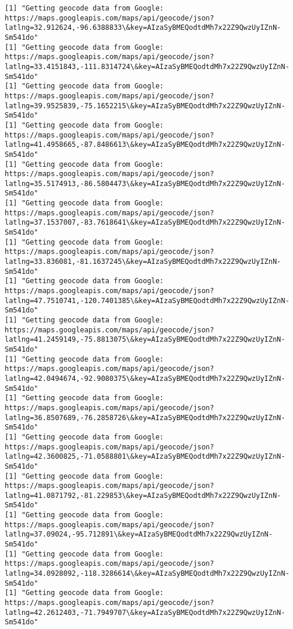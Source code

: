 \documentclass[11pt]{article}
\begin{document}
\begin{Verbatim}[commandchars=\\\{\}]
[1] "Getting geocode data from Google: https://maps.googleapis.com/maps/api/geocode/json?latlng=32.912624,-96.6388833\&key=AIzaSyBMEQodtdMh7x22Z9QwzUyIZnN-Sm541do"
[1] "Getting geocode data from Google: https://maps.googleapis.com/maps/api/geocode/json?latlng=33.4151843,-111.8314724\&key=AIzaSyBMEQodtdMh7x22Z9QwzUyIZnN-Sm541do"
[1] "Getting geocode data from Google: https://maps.googleapis.com/maps/api/geocode/json?latlng=39.9525839,-75.1652215\&key=AIzaSyBMEQodtdMh7x22Z9QwzUyIZnN-Sm541do"
[1] "Getting geocode data from Google: https://maps.googleapis.com/maps/api/geocode/json?latlng=41.4958665,-87.8486613\&key=AIzaSyBMEQodtdMh7x22Z9QwzUyIZnN-Sm541do"
[1] "Getting geocode data from Google: https://maps.googleapis.com/maps/api/geocode/json?latlng=35.5174913,-86.5804473\&key=AIzaSyBMEQodtdMh7x22Z9QwzUyIZnN-Sm541do"
[1] "Getting geocode data from Google: https://maps.googleapis.com/maps/api/geocode/json?latlng=37.1537007,-83.7618641\&key=AIzaSyBMEQodtdMh7x22Z9QwzUyIZnN-Sm541do"
[1] "Getting geocode data from Google: https://maps.googleapis.com/maps/api/geocode/json?latlng=33.836081,-81.1637245\&key=AIzaSyBMEQodtdMh7x22Z9QwzUyIZnN-Sm541do"
[1] "Getting geocode data from Google: https://maps.googleapis.com/maps/api/geocode/json?latlng=47.7510741,-120.7401385\&key=AIzaSyBMEQodtdMh7x22Z9QwzUyIZnN-Sm541do"
[1] "Getting geocode data from Google: https://maps.googleapis.com/maps/api/geocode/json?latlng=41.2459149,-75.8813075\&key=AIzaSyBMEQodtdMh7x22Z9QwzUyIZnN-Sm541do"
[1] "Getting geocode data from Google: https://maps.googleapis.com/maps/api/geocode/json?latlng=42.0494674,-92.9080375\&key=AIzaSyBMEQodtdMh7x22Z9QwzUyIZnN-Sm541do"
[1] "Getting geocode data from Google: https://maps.googleapis.com/maps/api/geocode/json?latlng=36.8507689,-76.2858726\&key=AIzaSyBMEQodtdMh7x22Z9QwzUyIZnN-Sm541do"
[1] "Getting geocode data from Google: https://maps.googleapis.com/maps/api/geocode/json?latlng=42.3600825,-71.0588801\&key=AIzaSyBMEQodtdMh7x22Z9QwzUyIZnN-Sm541do"
[1] "Getting geocode data from Google: https://maps.googleapis.com/maps/api/geocode/json?latlng=41.0871792,-81.229853\&key=AIzaSyBMEQodtdMh7x22Z9QwzUyIZnN-Sm541do"
[1] "Getting geocode data from Google: https://maps.googleapis.com/maps/api/geocode/json?latlng=37.09024,-95.712891\&key=AIzaSyBMEQodtdMh7x22Z9QwzUyIZnN-Sm541do"
[1] "Getting geocode data from Google: https://maps.googleapis.com/maps/api/geocode/json?latlng=34.0928092,-118.3286614\&key=AIzaSyBMEQodtdMh7x22Z9QwzUyIZnN-Sm541do"
[1] "Getting geocode data from Google: https://maps.googleapis.com/maps/api/geocode/json?latlng=42.2612403,-71.7949707\&key=AIzaSyBMEQodtdMh7x22Z9QwzUyIZnN-Sm541do"

\end{Verbatim}
\end{document}
